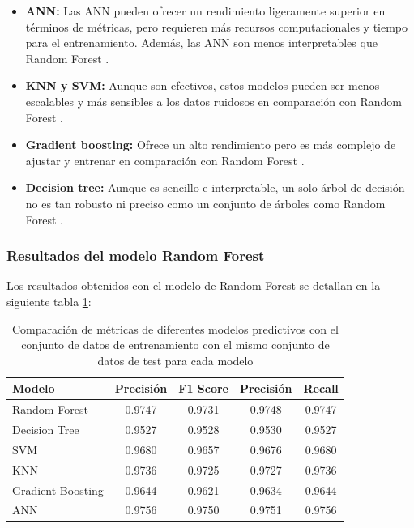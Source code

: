 \begin{itemize}
\item \textbf{ANN:} Las ANN pueden ofrecer un rendimiento ligeramente superior en términos de métricas, pero requieren más recursos computacionales y tiempo para el entrenamiento. Además, las ANN son menos interpretables que Random Forest \cite{goodfellow2016deep}.
\item \textbf{KNN y SVM:} Aunque son efectivos, estos modelos pueden ser menos escalables y más sensibles a los datos ruidosos en comparación con Random Forest \cite{hastie2009elements}.
\item \textbf{Gradient boosting:} Ofrece un alto rendimiento pero es más complejo de ajustar y entrenar en comparación con Random Forest \cite{friedman2001greedy}.
\item \textbf{Decision tree:} Aunque es sencillo e interpretable, un solo árbol de decisión no es tan robusto ni preciso como un conjunto de árboles como Random Forest \cite{breiman2001random}.
\end{itemize}

\subsubsection{Resultados del modelo Random Forest}

Los resultados obtenidos con el modelo de Random Forest se detallan en la siguiente tabla \ref{tab:comparison}:

\begin{table}[h]
    \centering
    \begin{tabular}{lcccc}
        \toprule
        Modelo & Precisión & F1 Score & Precisión & Recall \\
        \midrule
        Random Forest & 0.9747 & 0.9731 & 0.9748 & 0.9747 \\
        Decision Tree & 0.9527 & 0.9528 & 0.9530 & 0.9527 \\
        SVM & 0.9680 & 0.9657 & 0.9676 & 0.9680 \\
        KNN & 0.9736 & 0.9725 & 0.9727 & 0.9736 \\
        Gradient Boosting & 0.9644 & 0.9621 & 0.9634 & 0.9644 \\
        ANN & 0.9756 & 0.9750 & 0.9751 & 0.9756 \\
        \bottomrule
    \end{tabular}
    \caption{Comparación de métricas de diferentes modelos predictivos con el conjunto de datos de entrenamiento con el mismo conjunto de datos de test para cada modelo}
    \label{tab:comparison}
\end{table}

